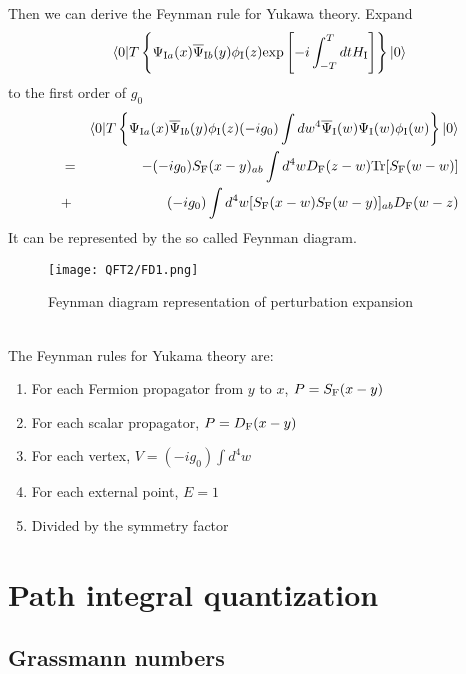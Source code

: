 \noindent
Then we can derive the Feynman rule for Yukawa theory. 
Expand
\[\langle 0 | T \left\{ \Psi_{{\rm I}a}(x) \overline{\Psi}_{{\rm I}b}(y) \phi_{\rm I}(z) \mathrm{exp} \left[ -i \int_{-T}^{T} dt H_{\rm I} \right]\right\} | 0 \rangle\] 
to the first order of $g_0$
\begin{eqnarray}
& &\langle 0 | T \left\{ \Psi_{{\rm I}a}(x) \overline{\Psi}_{{\rm I}b}(y) \phi_{\rm {\rm I}}(z) (-i g_0) \int dw^4 \overline{\Psi}_{\rm I}(w) \Psi_{\rm I}(w) \phi_{\rm I}(w) \right\} | 0 \rangle \nonumber \\
&=& -(-ig_0) S_{\rm F}(x-y)_{ab} \int d^4 w D_{\rm F}(z-w) \mathrm{Tr}[S_{\rm F}(w-w)] \nonumber \\
&+&  (-ig_0) \int d^4 w  [S_{\rm F}(x-w) S_{\rm F}(w-y)]_{ab} D_{\rm F}(w-z) \nonumber
\end{eqnarray}
It can be represented by the so called Feynman diagram.
\begin{figure}[!h]
\centering
\texttt{[image: QFT2/FD1.png]}
\caption{Feynman diagram representation of perturbation expansion}
\end{figure}\\
The Feynman rules for Yukama theory are:
\begin{enumerate}
\item For each Fermion propagator from $y$ to $x$, $P = S_{\rm F}(x-y)$
\item For each scalar propagator, $P = D_{\rm F}(x-y)$
\item For each vertex, $V = (-ig_0)\int d^4w$
\item For each external point, $E=1$
\item Divided by the symmetry factor
\end{enumerate}

\section{Path integral quantization}
\subsection{Grassmann numbers}
